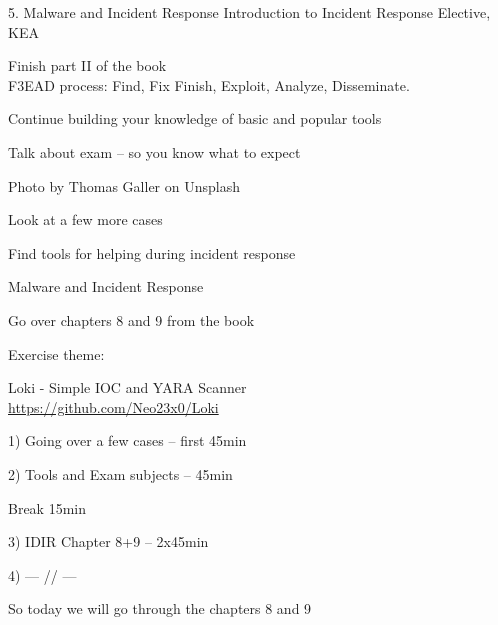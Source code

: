 \documentclass[Screen16to9,17pt]{foils}
\begin{document}
\mytitlepage
{5. Malware and Incident Response}
{Introduction to Incident Response Elective, KEA}




\begin{list2}
\item Finish part II of the book\\
F3EAD process: Find, Fix Finish, Exploit, Analyze, Disseminate.
\item Continue building your knowledge of basic and popular tools
\item Talk about exam -- so you know what to expect
\end{list2}

{\hfill \small Photo by Thomas Galler on Unsplash}


\begin{list2}
\item Look at a few more cases
\item Find tools for helping during incident response
\item Malware and Incident Response
\item Go over chapters 8 and 9 from the book
\end{list2}

Exercise theme:
\begin{list2}
\item Loki - Simple IOC and YARA Scanner\\
\url{https://github.com/Neo23x0/Loki}
\end{list2}




\begin{list2}
\item 1) Going over a few cases -- first 45min
\item 2) Tools and Exam subjects -- 45min
\item Break 15min
\item 3) IDIR Chapter 8+9 -- 2x45min
\item 4) --- // ---
\end{list2}

So today we will go through the chapters 8 and 9
\end{document}
